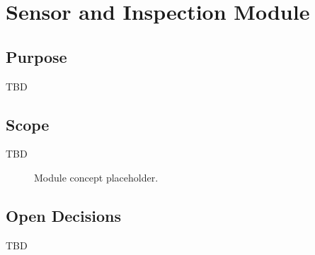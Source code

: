 \chapter{Sensor and Inspection Module}

\section{Purpose}

TBD

\section{Scope}

TBD

\begin{figure}[h]
\centering
{}
\caption{Module concept placeholder.}
\end{figure}


\section{Open Decisions}

TBD

